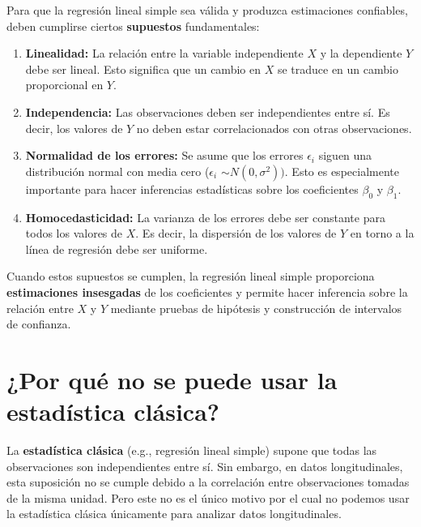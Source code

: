 \documentclass[
  letterpaper,
  DIV=11,
  numbers=noendperiod]{scrreprt}
\begin{document}
Para que la regresión lineal simple sea válida y produzca estimaciones
confiables, deben cumplirse ciertos \textbf{supuestos} fundamentales:

\begin{enumerate}
\def\labelenumi{\arabic{enumi}.}
\item
  \textbf{Linealidad:} La relación entre la variable independiente \(X\)
  y la dependiente \(Y\) debe ser lineal. Esto significa que un cambio
  en \(X\) se traduce en un cambio proporcional en \(Y\).
\item
  \textbf{Independencia:} Las observaciones deben ser independientes
  entre sí. Es decir, los valores de \(Y\) no deben estar
  correlacionados con otras observaciones.
\item
  \textbf{Normalidad de los errores:} Se asume que los errores
  \(\epsilon_i\) siguen una distribución normal con media cero
  (\(\epsilon_i\) \(\sim N(0, \sigma^2))\). Esto es especialmente
  importante para hacer inferencias estadísticas sobre los coeficientes
  \(\beta_0\) y \(\beta_1\).
\item
  \textbf{Homocedasticidad:} La varianza de los errores debe ser
  constante para todos los valores de \(X\). Es decir, la dispersión de
  los valores de \(Y\) en torno a la línea de regresión debe ser
  uniforme.
\end{enumerate}

Cuando estos supuestos se cumplen, la regresión lineal simple
proporciona \textbf{estimaciones insesgadas} de los coeficientes y
permite hacer inferencia sobre la relación entre \(X\) y \(Y\) mediante
pruebas de hipótesis y construcción de intervalos de confianza.

\section{¿Por qué no se puede usar la estadística
clásica?}\label{por-quuxe9-no-se-puede-usar-la-estaduxedstica-cluxe1sica}

La \textbf{estadística clásica} (e.g., regresión lineal simple) supone
que todas las observaciones son independientes entre sí. Sin embargo, en
datos longitudinales, esta suposición no se cumple debido a la
correlación entre observaciones tomadas de la misma unidad. Pero este no
es el único motivo por el cual no podemos usar la estadística clásica
únicamente para analizar datos longitudinales.
\end{document}
